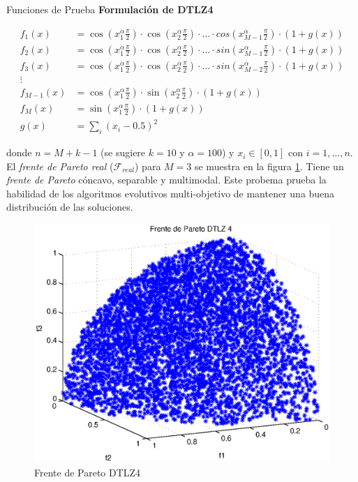 \begin{chapter}{Funciones de Prueba}
\textbf{Formulaci\'on de DTLZ4}

\begin{align*}
f_1(x)&=\cos(x_1^\alpha\frac{\pi}{2})\cdot\cos(x_2^\alpha\frac{\pi}{2})\cdot\ldots\cdot cos(x_{M-1}^\alpha\frac{\pi}{2})\cdot(1+g(x))\\
f_2(x)&=\cos(x_1^\alpha\frac{\pi}{2})\cdot\cos(x_2^\alpha\frac{\pi}{2})\cdot\ldots\cdot sin(x_{M-1}^\alpha\frac{\pi}{2})\cdot(1+g(x))\\
f_3(x)&=\cos(x_1^\alpha\frac{\pi}{2})\cdot\cos(x_2^\alpha\frac{\pi}{2})\cdot\ldots\cdot sin(x_{M-2}^\alpha\frac{\pi}{2})\cdot(1+g(x))\\
\vdots&\\
f_{M-1}(x)&=\cos(x_1^\alpha\frac{\pi}{2})\cdot\sin(x_2^\alpha\frac{\pi}{2})\cdot(1+g(x))\\
f_{M}(x)&=\sin(x_1^\alpha\frac{\pi}{2})\cdot(1+g(x))\\
g(x)&=\sum_i(x_i-0.5)^2
\end{align*}


donde $n=M+k-1$ (se sugiere $k=10$ y $\alpha=100$) y $x_i\in[0,1]$ con $i=1,\ldots, n$. El \textit{frente de Pareto real} ($\mathcal{F}_{real}$) 
para $M=3$ se muestra en la figura \ref{fig:DTLZ4}. Tiene un {\it frente de Pareto}  c\'oncavo, separable y multimodal. Este probema prueba 
la habilidad de los algoritmos evolutivos multi-objetivo de mantener una buena distribuci\'on de las soluciones.

\begin{figure}[h!]
 \centering
\includegraphics[scale=0.4]{ApendiceA/paretoDTLZ4.eps}
\caption{Frente de Pareto DTLZ4}
\label{fig:DTLZ4}
\end{figure}


\end{chapter}
